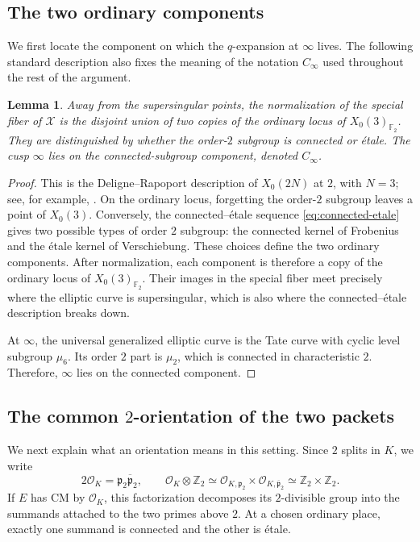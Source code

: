 \documentclass[11pt]{amsart}
\newtheorem{lemma}[theorem]{Lemma}
\theoremstyle{remark}
\numberwithin{equation}{section}
\newcommand{\F}{\mathbb F}
\newcommand{\Z}{\mathbb Z}
\newcommand{\cO}{\mathcal O}
\newcommand{\cX}{\mathcal X}
\begin{document}
\subsection{The two ordinary components}

We first locate the component on which the $q$-expansion at $\infty$ lives.
The following standard description also fixes the meaning of the notation
$C_\infty$ used throughout the rest of the argument.

\begin{lemma}\label{lem:components}
 Away from the supersingular points, the normalization of the special fiber
 of $\cX$ is the disjoint union of two copies of the ordinary locus of
 $X_0(3)_{\F_2}$.  They are distinguished by whether the order-$2$ subgroup
 is connected or \'etale.  The cusp $\infty$ lies on the connected-subgroup
 component, denoted $C_\infty$.
\end{lemma}

\begin{proof}
 This is the Deligne--Rapoport description of $X_0(2N)$ at $2$, with
 $N=3$; see, for example, \cite[Chapter~VI]{DR}.  On the ordinary locus, forgetting the
 order-$2$ subgroup leaves a point of $X_0(3)$.  Conversely, the
 connected--\'etale sequence \eqref{eq:connected-etale} gives two possible
 types of order $2$ subgroup: the connected kernel of Frobenius and the
 \'etale kernel of Verschiebung.  These choices define the two ordinary
 components.  After normalization, each component is therefore a
 copy of the ordinary locus of $X_0(3)_{\F_2}$.  Their images in the special
 fiber meet precisely where the elliptic curve is supersingular, which is
 also where the connected--\'etale description breaks down.

 At $\infty$, the universal generalized elliptic curve is the Tate curve
 with cyclic level subgroup $\mu_6$.  Its order $2$ part is $\mu_2$, which
 is connected in characteristic $2$.  Therefore, $\infty$ lies on the connected
 component.
\end{proof}

\subsection{The common \texorpdfstring{$2$}{2}-orientation of the two packets}

We next explain what an orientation means in this setting.  Since $2$ splits
in $K$, we write
\[
 2\cO_K=\mathfrak p_2\overline{\mathfrak p}_2,
 \qquad
 \cO_K\otimes\Z_2\simeq
 \cO_{K,\mathfrak p_2}\times
 \cO_{K,\overline{\mathfrak p}_2}
 \simeq\Z_2\times\Z_2.
\]
If $E$ has CM by $\cO_K$, this factorization decomposes its $2$-divisible
group into the summands attached to the two primes above $2$.  At a chosen
ordinary place, exactly one summand is connected and the other is \'etale.
\end{document}

